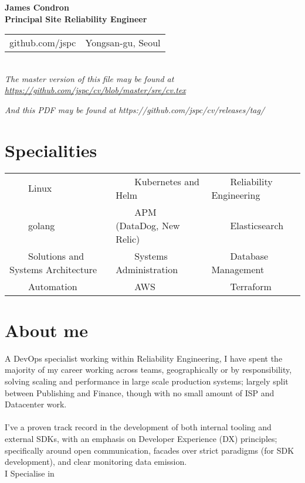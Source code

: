 \documentclass[11pt,a4paper,sans]{article}
\newcommand{\tabitem}{~~\llap{\textbullet}~~}
\begin{document}
\begin{center}
  {\huge\textbf{James Condron}}\\
  \textbf{Principal Site Reliability Engineer} \\

  \begin{tabular}{rl}
    github.com/jspc & Yongsan-gu, Seoul
  \end{tabular} \\

  {\footnotesize\textit{The master version of this file may be found at \url{https://github.com/jspc/cv/blob/master/sre/cv.tex}}}

  {\footnotesize\textit{And this PDF may be found at https://github.com/jspc/cv/releases/tag/}}%
  {}

\end{center}

\section{Specialities}
\begin{tabular}{lll}
  \tabitem Linux & \tabitem Kubernetes and Helm & \tabitem Reliability Engineering \\
  \tabitem golang & \tabitem APM (DataDog, New Relic) & \tabitem Elasticsearch \\
  \tabitem Solutions and Systems Architecture & \tabitem Systems Administration & \tabitem Database Management \\
  \tabitem Automation & \tabitem AWS & \tabitem Terraform  \\
\end{tabular}

\section{About me}
A DevOps specialist working within Reliability Engineering, I have spent the majority of my career working across teams, geographically or by responsibility, solving scaling and performance in large scale production systems; largely split between Publishing and Finance, though with no small amount of ISP and Datacenter work. \\
\\
I've a proven track record in the development of both internal tooling and external SDKs, with an emphasis on Developer Experience (DX) principles; specifically around open communication, facades over strict paradigms (for SDK development), and clear monitoring data emission.
\\
I Specialise in
\end{document}
